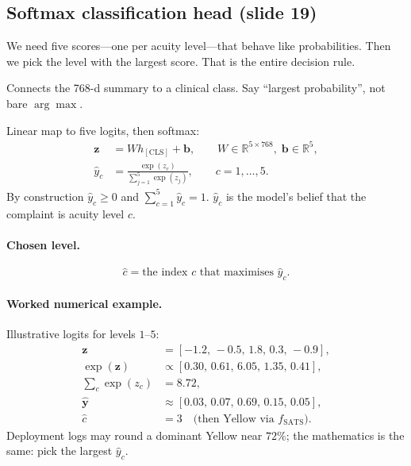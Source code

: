 \subsection{Softmax classification head (slide 19)}
\label{sec:expl-softmax}

\begin{intuitbox}
We need five scores---one per acuity level---that behave like probabilities.
Then we pick the level with the largest score. That is the entire decision rule.
\end{intuitbox}

\begin{whybox}
Connects the 768-d summary to a clinical class. Say ``largest probability'', not bare \(\arg\max\).
\end{whybox}

Linear map to five logits, then softmax:
\begin{align}
  \mathbf{z} &= W h_{\mathrm{[CLS]}} + \mathbf{b},
  \qquad W\in\mathbb{R}^{5\times 768},\; \mathbf{b}\in\mathbb{R}^{5},
  \label{eq:logits}\\
  \hat{y}_c &= \frac{\exp(z_c)}{\sum_{j=1}^{5}\exp(z_j)},
  \qquad c=1,\ldots,5.
  \label{eq:softmax}
\end{align}
By construction \(\hat{y}_c \ge 0\) and \(\sum_{c=1}^{5}\hat{y}_c = 1\).
\(\hat{y}_c\) is the model's belief that the complaint is acuity level \(c\).

\paragraph{Chosen level.}
\begin{equation}
  \hat{c} = \text{the index \(c\) that maximises \(\hat{y}_c\)}.
\end{equation}

\paragraph{Worked numerical example.}
Illustrative logits for levels \(1\)--\(5\):
\begin{align*}
  \mathbf{z} &= [-1.2,\,-0.5,\,1.8,\,0.3,\,-0.9], \\
  \exp(\mathbf{z}) &\propto [0.30,\,0.61,\,6.05,\,1.35,\,0.41], \\
  \sum_{c} \exp(z_c) &= 8.72, \\
  \hat{\mathbf{y}} &\approx [0.03,\,0.07,\,0.69,\,0.15,\,0.05], \\
  \hat{c} &= 3 \quad\text{(then Yellow via \(f_{\mathrm{SATS}}\))}.
\end{align*}
Deployment logs may round a dominant Yellow near \(72\%\); the mathematics is the same: pick the largest \(\hat{y}_c\).


